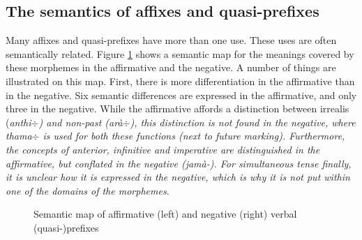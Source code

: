 \subsection{The semantics of affixes and quasi-prefixes}\label{sec:morph:Thesemanticsofaffixesandquasi-prefixes}
Many affixes and quasi-prefixes have more than one use. These uses are often semantically related. Figure \ref{fig:form:semanticmapofaffixes} shows a semantic map for the meanings covered by these morphemes in the affirmative and the negative. A number of things are illustrated on this map. First, there is more differentiation in the affirmative than in the negative. Six semantic differences are expressed in the affirmative, and only three in the negative. While the affirmative affords a distinction between irrealis (\em anthi$\div$\em) and non-past (\em arà$\div$\em), this distinction is not found in the negative, where \em thama$\div$ \em is used for both these functions (next to future marking). Furthermore, the concepts of anterior, infinitive and imperative are distinguished in the affirmative, but conflated in the negative (\em jamà-\em). For simultaneous tense finally, it is unclear how it is expressed in the negative, which is why it is not put within one of the domains of the morphemes.
 

\begin{figure}
\centering
{}
 \vspace{0.5cm}
\caption[Semantic map of affirmative   and negative   verbal (quasi-)prefixes]{Semantic map of affirmative (left) and negative (right)  verbal (quasi-)prefixes}
\label{fig:form:semanticmapofaffixes}
\end{figure} 


